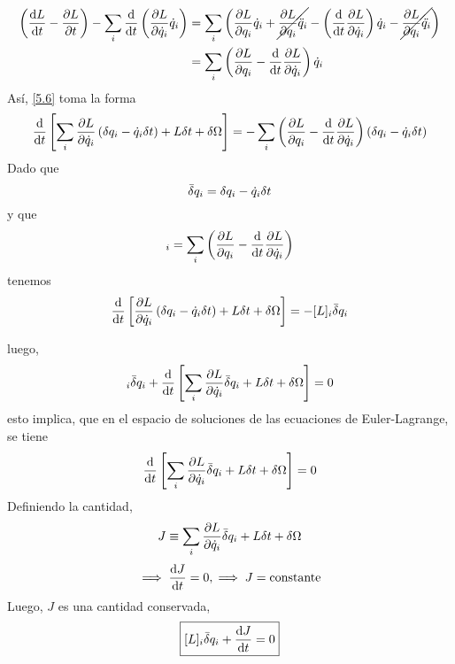 \begin{align}
  \left(\dv{L}{t}-\pdv{L}{t}\right)-\sum_i\dv{t}\l(\pdv{L}{\qd_i}\qd_i\r)&=\sum_i\l(\pdv{L}{q_i}\qd_i+\cancel{\pdv{L}{q_i}\ddot{q}_i}-\l(\dv{t}\pdv{L}{\qd_i}\r)\qd_i-\cancel{\pdv{L}{q_i}\ddot{q_i}}\r)\\
  &=\sum_i\l(\pdv{L}{q_i}-\dv{t}\pdv{L}{\qd_i}\r)\qd_i\label{5.7}
\end{align}
Así, \eqref{5.6} toma la forma
\begin{equation}
  \dv{t}\left[\sum_i\pdv{L}{\qd_i}\l(\d q_i-\qd_i\d t\r)+L\d t+\d\Omega\right]=-\sum_i\l(\pdv{L}{q_i}-\dv{t}\pdv{L}{\qd_i}\r)(\d q_i-\qd_i\d t)
\end{equation}
Dado que
\begin{equation}
  \bar{\delta} q_i=\delta q_i-\dot{q}_i\delta t
\end{equation}
y que
\begin{equation}
  [L]_i=\sum_i\l(\EL\r)
\end{equation}
tenemos
\begin{equation}
  \dv{t}\left[\pdv{L}{\qd_i}\l(\d q_i-\qd_i\d t\r)+L\d t+\d\Omega\right]=-[L]_i\db q_i
\end{equation}

luego,
\begin{equation}
  [L]_i\db q_i+\dv{t}\left[\sum_i\pdv{L}{\qd_i}\db q_i+L\d t+\d\Omega \right]=0
\end{equation}
esto implica, que en el espacio de soluciones de las ecuaciones de Euler-Lagrange, se tiene
\begin{equation}
  \dv{t}\left[\sum_i\pdv{L}{\dot{q}_i}\bar{\delta} q_i+L\delta t+\delta\Omega \right]=0
\end{equation}
Definiendo la cantidad,
\begin{equation}
  J\equiv \sum_i\pdv{L}{\dot{q}_i}\bar{\delta} q_i+L\delta t+\delta\Omega 
\end{equation}
\begin{equation}
  \implies \dv{J}{t}=0,\implies   J=\text{constante}
\end{equation}
Luego, $J$ es una cantidad conservada,
\begin{equation}
  \boxed{[L]_i\bar{\delta} q_i+\dv{J}{t}=0}
\end{equation}






























